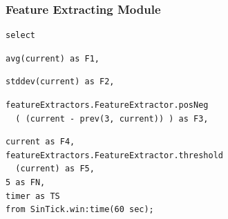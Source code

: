 \documentclass{beamer}
\begin{document}
  \begin{frame}
    \frametitle{Feature Extracting Module}
    \begin{lstlisting}
select
    \end{lstlisting}
    \begin{lstlisting}
avg(current) as F1,
  \end{lstlisting}
    \begin{lstlisting}
stddev(current) as F2,
    \end{lstlisting}
    \begin{lstlisting}
featureExtractors.FeatureExtractor.posNeg
  ( (current - prev(3, current)) ) as F3,
    \end{lstlisting}
    \begin{lstlisting}
current as F4,
featureExtractors.FeatureExtractor.threshold
  (current) as F5,
5 as FN,
timer as TS
from SinTick.win:time(60 sec);
    \end{lstlisting}
  \end{frame}

\end{document}
